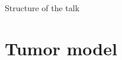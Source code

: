 
\begin{frame}[t,plain]
\titlepage
\end{frame}

\begin{frame}{Structure of the talk}
	\tableofcontents
\end{frame}

\section{Tumor model}


